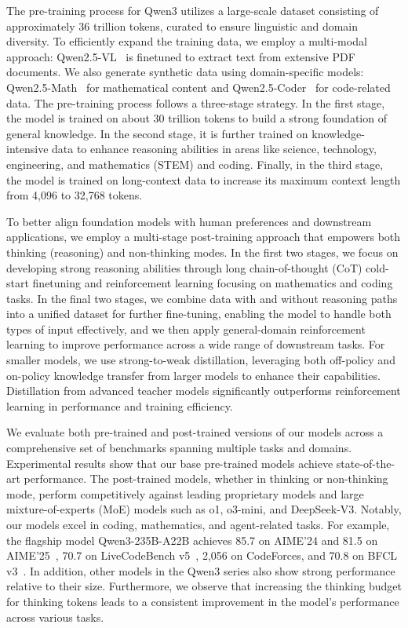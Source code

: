\documentclass[dvipsnames]{article}
\begin{document}
The pre-training process for Qwen3 utilizes a large-scale dataset consisting of approximately 36 trillion tokens, curated to ensure linguistic and domain diversity. To efficiently expand the training data, we employ a multi-modal approach: Qwen2.5-VL~\citep{qwen2.5vl} is finetuned to extract text from extensive PDF documents. We also generate synthetic data using domain-specific models: Qwen2.5-Math~\citep{qwen2.5math} for mathematical content and Qwen2.5-Coder~\citep{qwen2.5coder} for code-related data. The pre-training process follows a three-stage strategy. In the first stage, the model is trained on about 30 trillion tokens to build a strong foundation of general knowledge. In the second stage, it is further trained on knowledge-intensive data to enhance reasoning abilities in areas like science, technology, engineering, and mathematics (STEM) and coding. Finally, in the third stage, the model is trained on long-context data to increase its maximum context length from 4,096 to 32,768 tokens.

To better align foundation models with human preferences and downstream applications, we employ a multi-stage post-training approach that empowers both thinking (reasoning) and non-thinking modes. In the first two stages, we focus on developing strong reasoning abilities through long chain-of-thought (CoT) cold-start finetuning and reinforcement learning focusing on mathematics and coding tasks. In the final two stages, we combine data with and without reasoning paths into a unified dataset for further fine-tuning, enabling the model to handle both types of input effectively, and we then apply general-domain reinforcement learning to improve performance across a wide range of downstream tasks. For smaller models, we use strong-to-weak distillation, leveraging both off-policy and on-policy knowledge transfer from larger models to enhance their capabilities.
Distillation from advanced teacher models significantly outperforms reinforcement learning in performance and training efficiency.

We evaluate both pre-trained and post-trained versions of our models across a comprehensive set of benchmarks spanning multiple tasks and domains. Experimental results show that our base pre-trained models achieve state-of-the-art performance. The post-trained models, whether in thinking or non-thinking mode, perform competitively against leading proprietary models and large mixture-of-experts (MoE) models such as o1, o3-mini, and DeepSeek-V3. Notably, our models excel in coding, mathematics, and agent-related tasks. For example, the flagship model Qwen3-235B-A22B achieves 85.7 on AIME'24 and 81.5 on AIME'25~\citep{aime}, 70.7 on LiveCodeBench v5~\citep{livecodebench}, 2,056 on CodeForces, and 70.8 on BFCL v3~\citep{bfcl}. In addition, other models in the Qwen3 series also show strong performance relative to their size. Furthermore, we observe that increasing the thinking budget for thinking tokens leads to a consistent improvement in the model's performance across various tasks.
\end{document}
